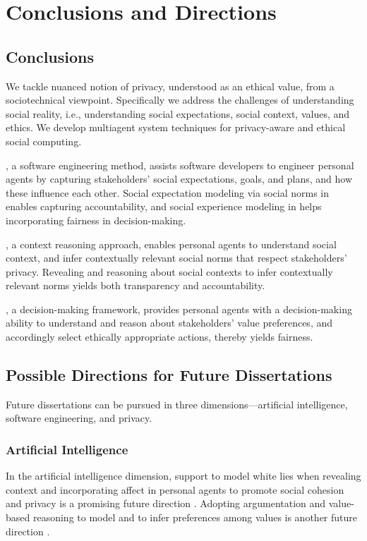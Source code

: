 \chapter{Conclusions and Directions}
\label{chap:conclusions}

\section{Conclusions}

We tackle nuanced notion of privacy, understood as an ethical value, from a sociotechnical viewpoint. 
Specifically we address the challenges of understanding social reality, i.e., understanding social expectations, social context, values, and ethics.
We develop multiagent system techniques for privacy-aware and ethical social computing.  

\frameworkA, a software engineering method, assists software developers to engineer personal agents by capturing stakeholders' social expectations, goals, and plans, and how these influence each other.  
Social expectation modeling via social norms in \frameworkA enables capturing accountability,
and social experience modeling in \frameworkA helps incorporating fairness in decision-making.

\frameworkB, a context reasoning approach, enables personal agents to understand social context, and infer contextually relevant social norms that respect stakeholders' privacy. 
Revealing and reasoning about social contexts to infer contextually relevant norms yields both transparency and accountability.

\frameworkAinur, a decision-making framework, provides personal agents with a decision-making ability to understand and reason about stakeholders' value preferences, 
and accordingly select ethically appropriate actions, thereby yields fairness.  

\section{Possible Directions for Future Dissertations}
Future dissertations can be pursued in three dimensions---artificial intelligence, software engineering, and privacy.

\subsection{Artificial Intelligence}
In the artificial intelligence dimension, support to model white lies when revealing context and incorporating affect in personal agents to promote social cohesion and privacy is a promising future direction \citep{IJCAI-18:Poros,Kalia+14:Emotions}.
Adopting argumentation and value-based reasoning to model and to infer preferences among values is another future direction \citep{Ajmeri-IJCAI16-Coco,Ajmeri-Computer17-Aragorn}.

